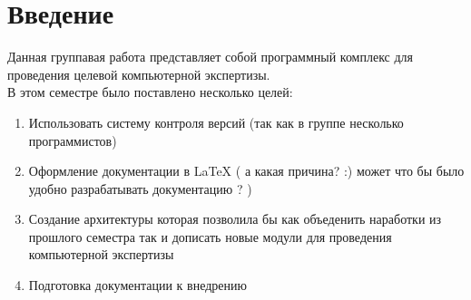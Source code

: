 \newpage

\chapter*{Введение}

Данная группавая работа представляет собой программный комплекс для проведения целевой компьютерной экспертизы. \\
В этом семестре было поставлено несколько целей: \\

\begin{enumerate}
\item Использовать систему контроля версий (так как в группе несколько программистов)
\item Оформление документации в LaTeX ( а какая причина? :) может что бы было удобно разрабатывать документацию ? )
\item Создание архитектуры которая позволила бы как объеденить наработки из прошлого семестра так и дописать новые модули для проведения компьютерной экспертизы
\item Подготовка документации к внедрению

\end{enumerate}